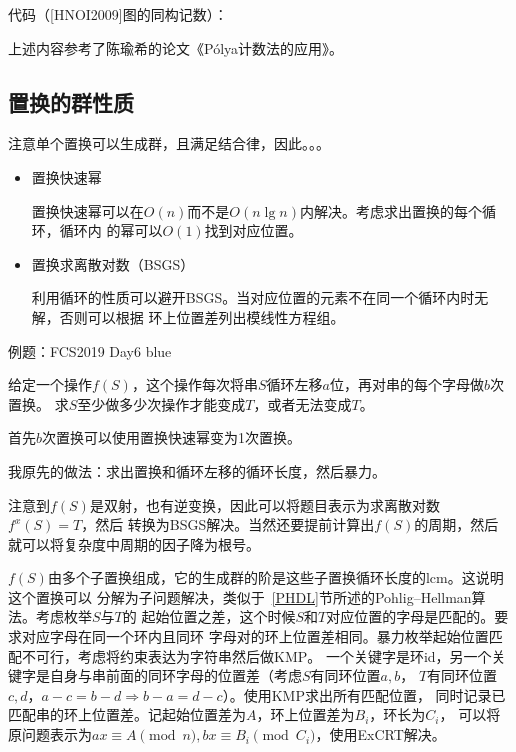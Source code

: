 代码（[HNOI2009]图的同构记数）：


上述内容参考了陈瑜希的论文《Pólya计数法的应用》。
\subsection{置换的群性质}
注意单个置换可以生成群，且满足结合律，因此。。。

\begin{itemize}
	\item 置换快速幂

	置换快速幂可以在$O(n)$而不是$O(n\lg n)$内解决。考虑求出置换的每个循环，循环内
	的幂可以$O(1)$找到对应位置。
	\item 置换求离散对数（BSGS）

	利用循环的性质可以避开BSGS。当对应位置的元素不在同一个循环内时无解，否则可以根据
	环上位置差列出模线性方程组。
\end{itemize}


例题：FCS2019 Day6 blue

给定一个操作$f(S)$，这个操作每次将串$S$循环左移$a$位，再对串的每个字母做$b$次置换。
求$S$至少做多少次操作才能变成$T$，或者无法变成$T$。

首先$b$次置换可以使用置换快速幂变为1次置换。

我原先的做法：求出置换和循环左移的循环长度，然后暴力。

注意到$f(S)$是双射，也有逆变换，因此可以将题目表示为求离散对数$f^x(S)=T$，然后
转换为BSGS解决。当然还要提前计算出$f(S)$的周期，然后就可以将复杂度中周期的因子降为根号。

$f(S)$由多个子置换组成，它的生成群的阶是这些子置换循环长度的lcm。这说明这个置换可以
分解为子问题解决，类似于~\ref{PHDL}节所述的Pohlig–Hellman算法。考虑枚举$S$与$T$的
起始位置之差，这个时候$S$和$T$对应位置的字母是匹配的。要求对应字母在同一个环内且同环
字母对的环上位置差相同。暴力枚举起始位置匹配不可行，考虑将约束表达为字符串然后做KMP。
一个关键字是环id，另一个关键字是自身与串前面的同环字母的位置差（考虑$S$有同环位置$a,b$，
$T$有同环位置$c,d$，$a-c=b-d\Rightarrow b-a=d-c$）。使用KMP求出所有匹配位置，
同时记录已匹配串的环上位置差。记起始位置差为$A$，环上位置差为$B_i$，环长为$C_i$，
可以将原问题表示为$ax\equiv A\pmod{n},bx\equiv B_i\pmod{C_i}$，使用ExCRT解决。
